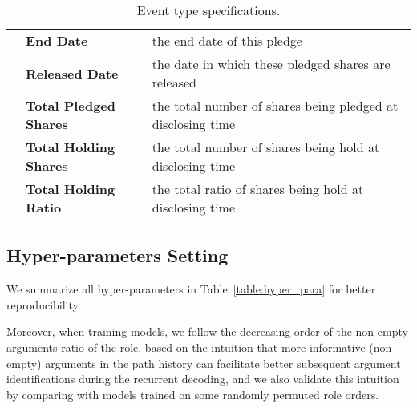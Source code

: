 \documentclass[11pt,a4paper]{article}
\begin{document}
\begin{table*}[htb]
\begin{tabular}{ c | l | l}
& \textbf{End Date} & the end date of this pledge \\
& \textbf{Released Date} & the date in which these pledged shares are released  \\
& \textbf{Total Pledged Shares} & the total number of shares being pledged at disclosing time \\
& \textbf{Total Holding Shares} & the total number of shares being hold at disclosing time \\
& \textbf{Total Holding Ratio} & the total ratio of shares being hold at disclosing time \\
\bottomrule
\end{tabular}
\caption{Event type specifications.}
\label{table:event}
\end{table*}


\subsection{Hyper-parameters Setting}
\label{sec:hyper_para}

We summarize all hyper-parameters in Table~\ref{table:hyper_para} for better reproducibility.

Moreover, when training models, we follow the decreasing order of the non-empty arguments ratio of the role, based on the intuition that more informative (non-empty) arguments in the path history can facilitate better subsequent argument identifications during the recurrent decoding, and we also validate this intuition by comparing with models trained on some randomly permuted role orders.
\end{document}
